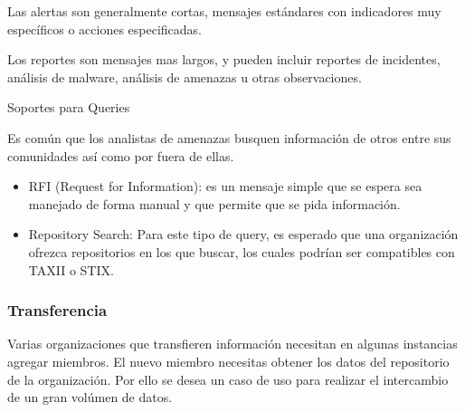 Las alertas son generalmente cortas, mensajes estándares con indicadores muy 
específicos o acciones especificadas.

Los reportes son mensajes mas largos, y pueden incluir reportes de incidentes, 
análisis de malware, análisis de amenazas u otras observaciones.

Soportes para Queries

Es común que los analistas de amenazas busquen información de otros entre sus comunidades
así como por fuera de ellas.
\begin{itemize}
  \item RFI (Request for Information): es un mensaje simple que se espera sea 
  manejado de forma manual y que permite que se pida información.
  \item Repository Search: Para este tipo de query, es esperado que una 
  organización ofrezca repositorios en los que buscar, los cuales podrían ser 
  compatibles con TAXII o STIX.
\end{itemize}

\subsubsection{Transferencia}

Varias organizaciones que transfieren información necesitan en algunas 
instancias agregar miembros. El nuevo miembro necesitas obtener los datos del 
repositorio de la organización. Por ello se desea un caso de uso para realizar 
el intercambio de un gran volúmen de datos.

